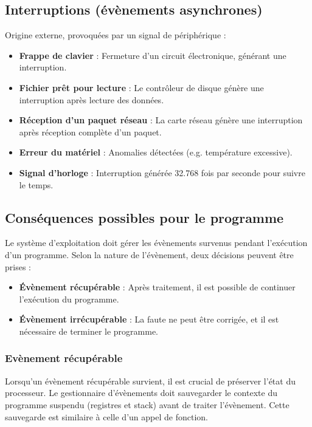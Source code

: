 \subsection{Interruptions (évènements asynchrones)}
Origine externe, provoquées par un signal de périphérique :
\begin{itemize}
    \item \textbf{Frappe de clavier} : Fermeture d’un circuit électronique, générant une interruption.
    \item \textbf{Fichier prêt pour lecture} : Le contrôleur de disque génère une interruption après lecture des données.
    \item \textbf{Réception d’un paquet réseau} : La carte réseau génère une interruption après réception complète d’un paquet.
    \item \textbf{Erreur du matériel} : Anomalies détectées (e.g. température excessive).
    \item \textbf{Signal d’horloge} : Interruption générée 32.768 fois par seconde pour suivre le temps.
\end{itemize}


\subsection{Conséquences possibles pour le programme}

Le système d'exploitation doit gérer les évènements survenus pendant l'exécution d'un programme. Selon la nature de l'évènement, deux décisions peuvent être prises :

\begin{itemize}
    \item \textbf{Évènement récupérable} : Après traitement, il est possible de continuer l'exécution du programme.
    \item \textbf{Évènement irrécupérable} : La faute ne peut être corrigée, et il est nécessaire de terminer le programme.
\end{itemize}

\subsubsection{Evènement récupérable}

Lorsqu'un évènement récupérable survient, il est crucial de préserver l'état du processeur. Le gestionnaire d'évènements doit sauvegarder le contexte du programme suspendu (registres et stack) avant de traiter l'évènement. Cette sauvegarde est similaire à celle d'un appel de fonction.

